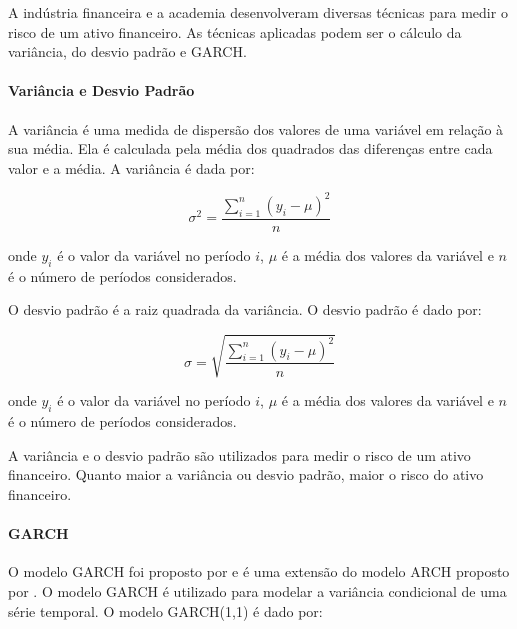                 \ipar A indústria financeira e a academia desenvolveram diversas técnicas para medir o risco de um ativo financeiro. As técnicas aplicadas podem ser o cálculo da variância, do desvio padrão e GARCH.

            \paragraph{Variância e Desvio Padrão}

                \ipar A variância é uma medida de dispersão dos valores de uma variável em relação à sua média. Ela é calculada pela média dos quadrados das diferenças entre cada valor e a média. A variância é dada por:

                \begin{equation}
                    \sigma^2 = \frac{{\sum_{i=1}^{n} (y_i - \mu)^2}}{{n}}
                \end{equation}

                \noindent onde $y_i$ é o valor da variável no período $i$, $\mu$ é a média dos valores da variável e $n$ é o número de períodos considerados.

                \ipar O desvio padrão é a raiz quadrada da variância. O desvio padrão é dado por:

                \begin{equation}
                    \sigma = \sqrt{\frac{{\sum_{i=1}^{n} (y_i - \mu)^2}}{{n}}}
                \end{equation}

                \noindent onde $y_i$ é o valor da variável no período $i$, $\mu$ é a média dos valores da variável e $n$ é o número de períodos considerados.

                \ipar A variância e o desvio padrão são utilizados para medir o risco de um ativo financeiro. Quanto maior a variância ou desvio padrão, maior o risco do ativo financeiro.


            \paragraph{\acrshort{GARCH}}

                \ipar O modelo \acrshort{GARCH} foi proposto por \cite{bollerslev1986generalized} e é uma extensão do modelo \acrshort{ARCH} proposto por \cite{engle1982autoregressive}. O modelo \acrshort{GARCH} é utilizado para modelar a variância condicional de uma série temporal. O modelo \acrshort{GARCH}(1,1) é dado por:

